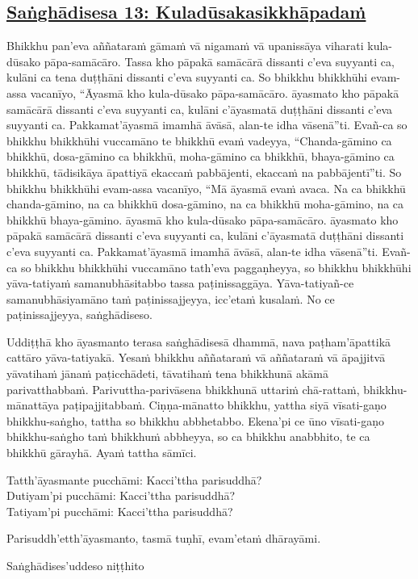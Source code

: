 \subsection*{\hyperref[comm13]{Saṅghādisesa 13: Kuladūsakasikkhāpadaṁ}}
\label{sd13}
Bhikkhu pan'eva aññataraṁ gāmaṁ vā nigamaṁ vā upanissāya viharati kula-dūsako pāpa-samācāro. Tassa kho pāpakā samācārā dissanti c'eva suyyanti ca, kulāni ca tena duṭṭhāni dissanti c'eva suyyanti ca. So bhikkhu bhikkhūhi evam-assa vacanīyo, “Āyasmā kho kula-dūsako pāpa-samācāro. āyasmato kho pāpakā samācārā dissanti c'eva suyyanti ca, kulāni c'āyasmatā duṭṭhāni dissanti c'eva suyyanti ca. Pakkamat'āyasmā imamhā āvāsā, alan-te idha vāsenā”ti. Evañ-ca so bhikkhu bhikkhūhi vuccamāno te bhikkhū evaṁ vadeyya, “Chanda-gāmino ca bhikkhū, dosa-gāmino ca bhikkhū, moha-gāmino ca bhikkhū, bhaya-gāmino ca bhikkhū, tādisikāya āpattiyā ekaccaṁ pabbājenti, ekaccaṁ na pabbājentī”ti. So bhikkhu bhikkhūhi evam-assa vacanīyo, “Mā āyasmā evaṁ avaca. Na ca bhikkhū chanda-gāmino, na ca bhikkhū dosa-gāmino, na ca bhikkhū moha-gāmino, na ca bhikkhū bhaya-gāmino. āyasmā kho kula-dūsako pāpa-samācāro. āyasmato kho pāpakā samācārā dissanti c'eva suyyanti ca, kulāni c'āyasmatā duṭṭhāni dissanti c'eva suyyanti ca. Pakkamat'āyasmā imamhā āvāsā, alan-te idha vāsenā”ti. Evañ-ca so bhikkhu bhikkhūhi vuccamāno tath'eva paggaṇheyya, so bhikkhu bhikkhūhi yāva-tatiyaṁ samanubhāsitabbo tassa paṭinissaggāya. Yāva-tatiyañ-ce samanubhāsiyamāno taṁ paṭinissajjeyya, icc'etaṁ kusalaṁ. No ce paṭinissajjeyya, saṅghādiseso.

\medskip

\begin{center}
Uddiṭṭhā kho āyasmanto terasa saṅghādisesā dhammā, nava paṭham'āpattikā cattāro yāva-tatiyakā. Yesaṁ bhikkhu aññataraṁ vā aññataraṁ vā āpajjitvā yāvatihaṁ jānaṁ paṭicchādeti, tāvatihaṁ tena bhikkhunā akāmā parivatthabbaṁ. Parivuttha-parivāsena bhikkhunā uttariṁ chā-rattaṁ, bhikkhu-mānattāya paṭipajjitabbaṁ. Ciṇṇa-mānatto bhikkhu, yattha siyā vīsati-gaṇo bhikkhu-saṅgho, tattha so bhikkhu abbhetabbo. Ekena'pi ce ūno vīsati-gaṇo bhikkhu-saṅgho taṁ bhikkhuṁ abbheyya, so ca bhikkhu anabbhito, te ca bhikkhū gārayhā. Ayaṁ tattha sāmīci.

\smallskip

Tatth'āyasmante pucchāmi: Kacci'ttha parisuddhā?\\
Dutiyam'pi pucchāmi: Kacci'ttha parisuddhā?\\
Tatiyam'pi pucchāmi: Kacci'ttha parisuddhā?

\smallskip

Parisuddh'etth'āyasmanto, tasmā tuṇhī, evam'etaṁ dhārayāmi.
\end{center}

\begin{outro}
  Saṅghādises'uddeso niṭṭhito
\end{outro}

\clearpage
